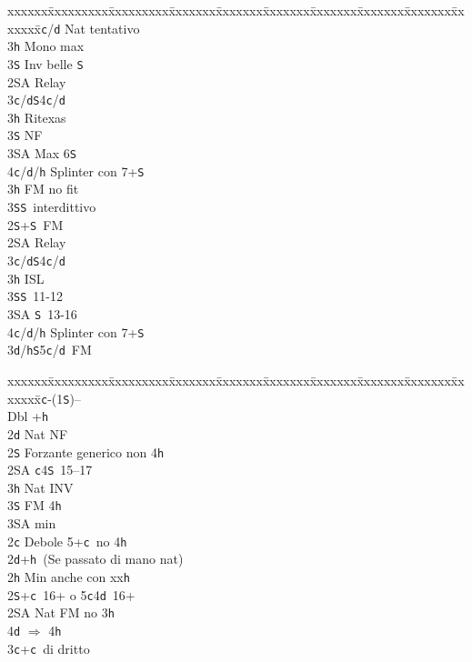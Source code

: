 \documentclass[a4paper,italian]{article}
\newcommand{\BS}{\small{\texttt{S}}}
\newcommand{\BC}{\small{\texttt{c}}}
\newcommand{\BD}{\small{\texttt{d}}}
\newcommand{\BH}{\small{\texttt{h}}}
\newenvironment{bidtable}
{\begin{tabbing}

    xxxxxx\=xxxxxxxxx\=xxxxxxxxx\=xxxxxxx\=xxxxxxx\=xxxxxxx\=xxxxxxx\=xxxxxxx\=xxxxxxx\=xxxxxxx\=\kill}
{\end{tabbing} }%
\begin{document}
\begin{multicols}{2}
\begin{bidtable}
        3\BC/\BD \> Nat tentativo\\
        3\BH \> Mono max\\
        3\BS \> Inv belle \BS \-\\
        2\small{SA} \> Relay\+\\
        3\BC/\BD {}\BS 4\BC /\BD \\
        3\BH \> Ritexas\+\\
        3\BS \> NF\-\\
        3\small{SA} \> Max 6\BS \\
        4\BC/\BD/\BH \> Splinter con 7+\BS \-\\
        3\BH \> FM no fit\\
        3\BS {}\BS\ interdittivo\-\\
        2\BS {}+\BS\ FM\+\\
        2\small{SA} \> Relay\+\\
        3\BC/\BD {}\BS 4\BC /\BD \\
        3\BH \> ISL\\
        3\BS {}\BS\ 11-12\\
        3\small{SA} \BS\ 13-16\\
        4\BC/\BD/\BH \> Splinter con 7+\BS \-\-\\
        3\BD/\BH {}\BS 5\BC /\BD\ FM\-
    \end{bidtable}
    \begin{bidtable}
        1\BC-(1\BS)--\+\\
        Dbl +\BH \+\\
        2\BD \> Nat NF\\
        2\BS \> Forzante generico non 4\BH \\
        2\small{SA} \BC 4\BS\ 15--17\\
        3\BH \> Nat INV\\
        3\BS \> FM 4\BH \+\\
        3\small{SA} \> min\-\-\\
        2\BC \> Debole 5+\BC\ no 4\BH \\
        2\BD {}+\BH\ (Se passato di mano nat)\+\\
        2\BH \> Min anche con xx\BH \\
        2\BS {}+\BC\ 16+ o 5\BC 4\BD\ 16+ \\
        2\small{SA} \> Nat FM no 3\BH \+\\
        4\BD \> $\Rightarrow$ 4\BH\-\\
        3\BC {}+\BC\ di dritto\\

\end{bidtable}
\end{multicols}
\end{document}

